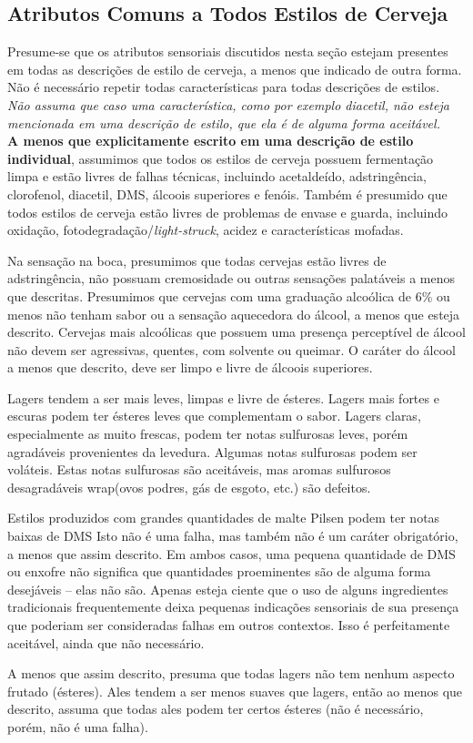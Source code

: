 \subsection*{Atributos Comuns a Todos Estilos de Cerveja}
Presume-se que os atributos sensoriais discutidos nesta seção estejam presentes em todas as descrições de estilo de cerveja, a menos que indicado de outra forma. Não é necessário repetir todas características para todas descrições de estilos. \textit{Não assuma que caso uma característica, como por exemplo diacetil, não esteja mencionada em uma descrição de estilo, que ela é de alguma forma aceitável.}\\
\textbf{A menos que explicitamente escrito em uma descrição de estilo individual}, assumimos que todos os estilos de cerveja possuem fermentação limpa e estão livres de falhas técnicas, incluindo acetaldeído, adstringência, clorofenol, diacetil, DMS, álcoois superiores e fenóis. Também é presumido que todos estilos de cerveja estão livres de problemas de envase e guarda, incluindo oxidação, fotodegradação/\textit{light-struck}, acidez e características mofadas.

Na sensação na boca, presumimos que todas cervejas estão livres de adstringência, não possuam cremosidade ou outras sensações palatáveis a menos que descritas. Presumimos que cervejas com uma graduação alcoólica de 6\% ou menos não tenham sabor ou a sensação aquecedora do álcool, a menos que esteja descrito. Cervejas mais alcoólicas que possuem uma presença perceptível de álcool não devem ser agressivas, quentes, com solvente ou queimar. O caráter do álcool a menos que descrito, deve ser limpo e livre de álcoois superiores.

Lagers tendem a ser mais leves, limpas e livre de ésteres.  Lagers mais fortes e escuras podem ter ésteres leves que complementam o sabor. Lagers claras, especialmente as muito frescas, podem ter notas sulfurosas leves, porém agradáveis provenientes da levedura. Algumas notas sulfurosas podem ser voláteis. Estas notas sulfurosas são aceitáveis, mas aromas sulfurosos desagradáveis wrap(ovos podres, gás de esgoto, etc.) são defeitos.

Estilos produzidos com grandes quantidades de malte Pilsen podem ter notas baixas de DMS Isto não é uma falha, mas também não é um caráter obrigatório, a menos que assim descrito. Em ambos casos, uma pequena quantidade de DMS ou enxofre não significa que quantidades proeminentes são de alguma forma desejáveis – elas não são. Apenas esteja ciente que o uso de alguns ingredientes tradicionais frequentemente deixa pequenas indicações sensoriais de sua presença que poderiam ser consideradas falhas em outros contextos. Isso é perfeitamente aceitável, ainda que não necessário.

A menos que assim descrito, presuma que todas lagers não tem nenhum aspecto frutado (ésteres). Ales tendem a ser menos suaves que lagers, então ao menos que descrito, assuma que todas ales podem ter certos ésteres (não é necessário, porém, não é uma falha).
